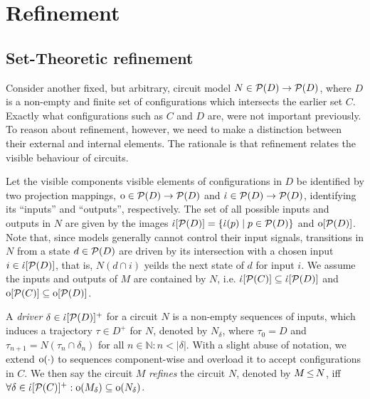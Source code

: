 \section{Refinement}

\subsection{Set-Theoretic refinement}

Consider another fixed, but arbitrary, circuit model $N \in \mathcal{P}(D) \rightarrow \mathcal{P}(D)$, where $D$ is a non-empty and finite set of configurations which intersects the earlier set $C$. Exactly what configurations such as $C$ and $D$ are, were not important previously. To reason about refinement, however, we need to make a distinction between their external and internal elements. The rationale is that refinement relates the visible behaviour of circuits. 


Let the visible components visible elements of configurations in $D$ be identified by two projection mappings, $\operatorname{\mathrm{o}} \in \mathcal{P}(D) \rightarrow \mathcal{P}(D)$ and $\operatorname{\dot{\iota}} \in \mathcal{P}(D) \rightarrow \mathcal{P}(D)$, identifying its ``inputs'' and ``outputs'', respectively. The set of all possible inputs and outputs in $N$ are given by the images $\operatorname{\dot{\iota}}[\mathcal{P}(D)] = \{ \operatorname{\dot{\iota}}(p) \mid p \in \mathcal{P}(D) \}$ and $\operatorname{\mathrm{o}}[\mathcal{P}(D)]$. Note that, since models generally cannot control their input signals, transitions in $N$ from a state $d \in \mathcal{P}(D)$ are driven by its intersection with a chosen input $i \in \operatorname{\dot{\iota}}[\mathcal{P}(D)]$, that is, $N(d \cap i)$ yeilds the next state of $d$ for input $i$. We assume the inputs and outputs of $M$ are contained by $N$, i.e. $\operatorname{\dot{\iota}}[\mathcal{P}(C)] \subseteq \operatorname{\dot{\iota}}[\mathcal{P}(D)]$ and $\operatorname{\mathrm{o}}[\mathcal{P}(C)] \subseteq \operatorname{\mathrm{o}}[\mathcal{P}(D)]$.

A \textit{driver} $\delta \in \operatorname{\dot{\iota}}[\mathcal{P}(D)]^{+}$ for a circuit $N$ is a non-empty sequences of inputs, which induces a trajectory $\tau \in D^{+}$ for $N$, denoted by $N_{\delta}$, where $\tau_{0} = D$ and $\tau_{n+1} = N(\tau_{n} \cap \delta_{n})$ for all $n \in \mathbb{N} : n < | \delta |$. With a slight abuse of notation, we extend $\operatorname{\mathrm{o}}(\cdot)$ to sequences component-wise and overload it to accept configurations in $C$. We then say the circuit $M$ \textit{refines} the circuit $N$, denoted by $M \operatorname{\leq} N$, iff $\forall \delta \in \operatorname{\dot{\iota}}[\mathcal{P}(C)]^{+} : \operatorname{\mathrm{o}}(M_{\delta}) \subseteq \operatorname{\mathrm{o}}(N_{\delta})$.

